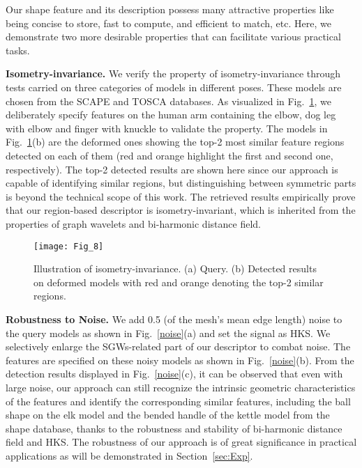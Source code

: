 Our shape feature and its description possess many attractive
properties like being concise to store, fast to compute, and efficient
to match, etc. Here, we demonstrate two more desirable properties that
can facilitate various practical tasks.

\textbf{Isometry-invariance.} We verify the property of
isometry-invariance through tests carried on three categories of
models in different poses. These models are chosen from the SCAPE and
TOSCA databases. As visualized in Fig.~\ref{pose-human}, we
deliberately specify features on the human arm containing the elbow,
dog leg with elbow and finger with knuckle to validate the property.
The models in Fig.~\ref{pose-human}(b) are the deformed ones showing
the top-2 most similar feature regions detected on each of them (red
and orange highlight the first and second one, respectively). The
top-2 detected results are shown here since our approach is capable
of identifying similar regions, but distinguishing between symmetric
parts is beyond the technical scope of this work. The retrieved
results empirically prove that our region-based descriptor is
isometry-invariant, which is inherited from the properties of graph
wavelets and bi-harmonic distance field.

\begin{figure}[!to]
\texttt{[image: Fig\_8]}
\caption[Illustration of the isometry-invariance property.]
  {Illustration of isometry-invariance. (a) Query. (b) Detected
  results on deformed models with red and orange denoting the top-2
  similar regions.}
\label{pose-human}
\end{figure}

\textbf{Robustness to Noise.} We add 0.5 (of the mesh's mean edge
length) noise to the query models as shown in Fig.~\ref{noise}(a) and
set the signal as HKS. We selectively enlarge the SGWs-related part
of our descriptor to combat noise. The features are specified on these
noisy models as shown in Fig.~\ref{noise}(b). From the detection
results displayed in Fig.~\ref{noise}(c), it can be observed that even
with large noise, our approach can still recognize the intrinsic
geometric characteristics of the features and identify the
corresponding similar features, including the ball shape on the elk
model and the bended handle of the kettle model from the shape
database, thanks to the robustness and stability of bi-harmonic
distance field and HKS. The robustness of our approach is of great
significance in practical applications as will be demonstrated in
Section~\ref{sec:Exp}.

